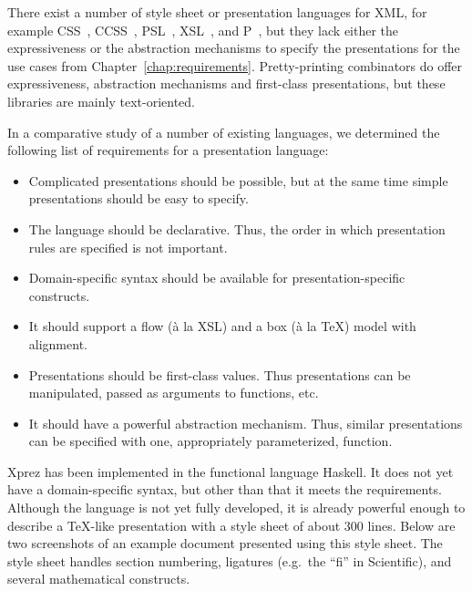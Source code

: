 There exist a number of style sheet or presentation languages for XML, for example CSS~\cite{css2}, CCSS~\cite{badros99ccss}, PSL~\cite{marden98psl}, XSL~\cite{xsl10}, and P~\cite{quint97thot}, but they lack either the expressiveness or the abstraction mechanisms to specify the presentations for the use cases from Chapter~\ref{chap:requirements}. Pretty-printing combinators \cite{oppen80prettyPrinting,swierstra98combinators,hughes1995prettyPrinting,kahl99galleyCombs,brand96generationOfFormatters} do offer expressiveness, abstraction mechanisms and first-class presentations, but these libraries are mainly text-oriented.


\bc
In a comparative study of a number of existing languages, we determined the following list of requirements for a presentation language:

\begin{itemize}
\item Complicated presentations should be possible, but at the same time simple presentations should be easy to specify.
\item The language should be declarative. Thus, the order in which presentation rules are specified is not important.
\item Domain-specific syntax should be available for presentation-specific constructs. 
\item It should support a flow (\`a la XSL) and a box (\`a la \TeX) model with alignment.
\item Presentations should be first-class values. Thus presentations can be manipulated, passed as arguments to functions, etc.
\item It should have a powerful abstraction mechanism. Thus, similar presentations can be specified with one, appropriately parameterized, function.
\end{itemize}
\ec

{\sc Xprez} has been implemented in the functional language Haskell. It does not yet have a domain-specific syntax, but other than that it meets the requirements. Although the language is not yet fully developed, it is already powerful enough to describe a \TeX -like presentation with a style sheet of about 300 lines. Below are two screenshots of an example document presented using this style sheet. The style sheet handles section numbering, ligatures (e.g.\ the ``fi'' in Scientific), and several mathematical constructs.

